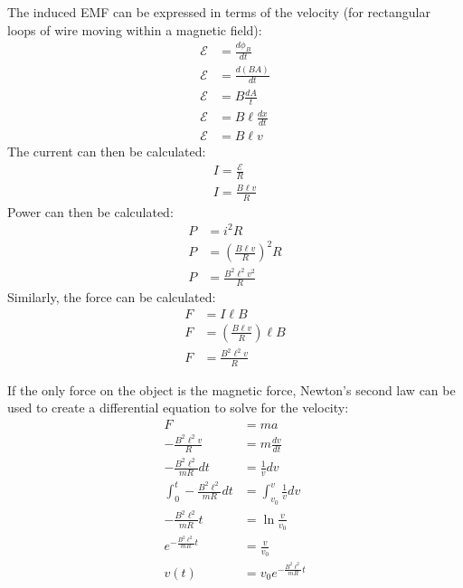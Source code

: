 \documentclass{article}
\begin{document}
            The induced EMF can be expressed in terms of the velocity (for rectangular loops of wire moving within a magnetic field):
            \begin{align}
                \mathcal{E} &= \frac{d\phi_B}{dt} \nonumber\\
                \mathcal{E} &= \frac{d\left(BA\right)}{dt} \nonumber\\
                \mathcal{E} &= B \frac{dA}{t} \nonumber\\
                \mathcal{E} &= B \ell \frac{dx}{dt} \nonumber\\
                \mathcal{E} &= B \ell v
            \end{align}
            The current can then be calculated:
            \begin{align}
                I = \frac{\mathcal{E}}{R} \nonumber\\
                I = \frac{B \ell v}{R}
            \end{align}
            Power can then be calculated:
            \begin{align}
                P &= i^2 R \nonumber\\
                P &= \left( \frac{B \ell v}{R} \right)^2 R \nonumber\\
                P &= \frac{B^2 \ell^2 v^2}{R}
            \end{align}
            Similarly, the force can be calculated:
            \begin{align}
                F &= I \ell B \nonumber\\
                F &= \left( \frac{B \ell v}{R} \right) \ell B \nonumber\\
                F &= \frac{B^2 \ell^2 v}{R}
            \end{align}

            If the only force on the object is the magnetic force, Newton's second law can be used to create a differential equation to solve for the velocity:
            \begin{align}
                F &= ma \nonumber\\
                - \frac{B^2 \ell^2 v}{R} &= m \frac{dv}{dt} \nonumber\\
                - \frac{B^2 \ell^2}{m R} dt &= \frac{1}{v} dv \nonumber\\
                \int_0^t - \frac{B^2 \ell^2}{m R} dt &= \int_{v_0}^v \frac{1}{v} dv \nonumber\\
                - \frac{B^2 \ell^2}{m R} t &= \ln{\frac{v}{v_0}} \nonumber\\
                e^{- \frac{B^2 \ell^2}{m R} t} &= \frac{v}{v_0} \nonumber\\
                v(t) &= v_0 e^{- \frac{B^2 \ell^2}{m R} t}
            \end{align}
\end{document}
